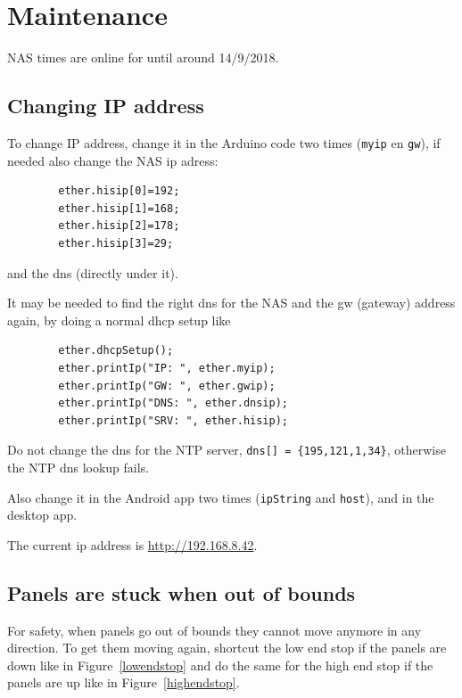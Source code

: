 \documentclass{article}
\begin{document}
    \tableofcontents
    \newpage

    \section{Maintenance}\label{sec:maintenance}
    NAS times are online for until around 14/9/2018.

    \subsection{Changing IP address}\label{subsec:changingIpAddress}

    To change IP address, change it in the Arduino code two times (\verb|myip| en \verb|gw|), if needed also change the NAS ip adress:
    \begin{lstlisting}
        ether.hisip[0]=192;
        ether.hisip[1]=168;
        ether.hisip[2]=178;
        ether.hisip[3]=29;
    \end{lstlisting}
    and the dns (directly under it).

    It may be needed to find the right dns for the NAS and the gw (gateway) address again, by doing a normal dhcp setup like
    \begin{lstlisting}
        ether.dhcpSetup();
        ether.printIp("IP: ", ether.myip);
        ether.printIp("GW: ", ether.gwip);
        ether.printIp("DNS: ", ether.dnsip);
        ether.printIp("SRV: ", ether.hisip);
    \end{lstlisting}
    Do not change the dns for the NTP server, \verb|dns[] = {195,121,1,34}|, otherwise the NTP dns lookup fails.

    Also change it in the Android app two times (\verb|ipString| and \verb|host|), and in the desktop app.

    The current ip address is \url{http://192.168.8.42}.

    \subsection{Panels are stuck when out of bounds}\label{subsec:outOfBounds}

    For safety, when panels go out of bounds they cannot move anymore in any direction.
    To get them moving again, shortcut the low end stop if the panels are down like in Figure~\ref{lowendstop} and do the same for the high end stop if the panels are up like in Figure~\ref{highendstop}.
\end{document}
